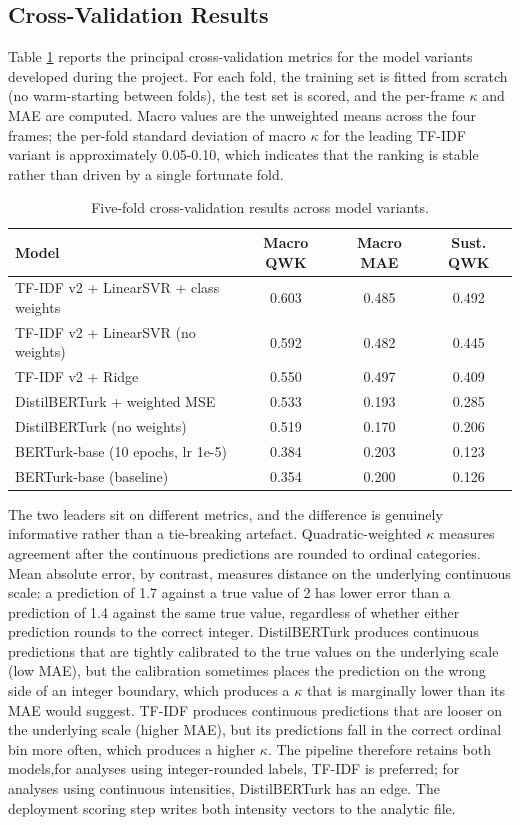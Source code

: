 \documentclass[12pt, journal]{IEEEtran}
\begin{document}
\subsection{Cross-Validation Results}
Table \ref{table_cv} reports the principal cross-validation metrics for the model variants developed during the project. For each fold, the training set is fitted from scratch (no warm-starting between folds), the test set is scored, and the per-frame $\kappa$ and MAE are computed. Macro values are the unweighted means across the four frames; the per-fold standard deviation of macro $\kappa$ for the leading TF-IDF variant is approximately 0.05-0.10, which indicates that the ranking is stable rather than driven by a single fortunate fold.

\begin{table}[!ht]
\renewcommand{\arraystretch}{1.3}
\caption{Five-fold cross-validation results across model variants.}
\label{table_cv}
\centering
\begin{tabular}{|l|c|c|c|}
\hline
\textbf{Model} & \textbf{Macro QWK} & \textbf{Macro MAE} & \textbf{Sust. QWK} \\
\hline\hline
TF-IDF v2 + LinearSVR + class weights & 0.603 & 0.485 & 0.492 \\
\hline
TF-IDF v2 + LinearSVR (no weights) & 0.592 & 0.482 & 0.445 \\
\hline
TF-IDF v2 + Ridge & 0.550 & 0.497 & 0.409 \\
\hline
DistilBERTurk + weighted MSE & 0.533 & 0.193 & 0.285 \\
\hline
DistilBERTurk (no weights) & 0.519 & 0.170 & 0.206 \\
\hline
BERTurk-base (10 epochs, lr 1e-5) & 0.384 & 0.203 & 0.123 \\
\hline
BERTurk-base (baseline) & 0.354 & 0.200 & 0.126 \\
\hline
\end{tabular}
\end{table}

The two leaders sit on different metrics, and the difference is genuinely informative rather than a tie-breaking artefact. Quadratic-weighted $\kappa$ measures agreement after the continuous predictions are rounded to ordinal categories. Mean absolute error, by contrast, measures distance on the underlying continuous scale: a prediction of 1.7 against a true value of 2 has lower error than a prediction of 1.4 against the same true value, regardless of whether either prediction rounds to the correct integer. DistilBERTurk produces continuous predictions that are tightly calibrated to the true values on the underlying scale (low MAE), but the calibration sometimes places the prediction on the wrong side of an integer boundary, which produces a $\kappa$ that is marginally lower than its MAE would suggest. TF-IDF produces continuous predictions that are looser on the underlying scale (higher MAE), but its predictions fall in the correct ordinal bin more often, which produces a higher $\kappa$. The pipeline therefore retains both models,for analyses using integer-rounded labels, TF-IDF is preferred; for analyses using continuous intensities, DistilBERTurk has an edge. The deployment scoring step writes both intensity vectors to the analytic file.
\end{document}
